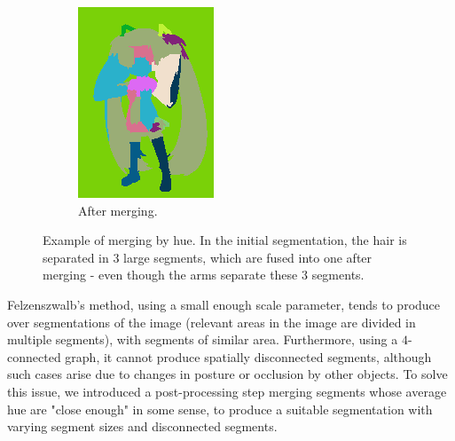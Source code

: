\begin{figure}[htb!]
\begin{subfigure}{0.3\textwidth}
\includegraphics[width=\textwidth]{images/miku_seg_fused.png}
\caption{After merging.}
\end{subfigure}
\caption{Example of merging by hue. In the initial segmentation, the hair is separated in 3 large segments, which are fused into one after merging - even though the arms separate these 3 segments.}
\end{figure}

Felzenszwalb's method, using a small enough scale parameter, tends to produce over segmentations of the image (relevant areas in the image are divided in multiple segments), with segments of similar area. Furthermore, using a $4$-connected graph, it cannot produce spatially disconnected segments, although such cases arise due to changes in posture or occlusion by other objects. To solve this issue, we introduced a post-processing step merging segments whose average hue are "close enough" in some sense, to produce a suitable segmentation with varying segment sizes and disconnected segments.

